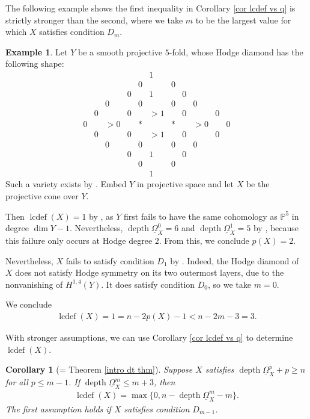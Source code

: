 \documentclass[11pt]{amsart}
\newtheorem{corollary}[equation]{Corollary}
\theoremstyle{definition}
\newtheorem{example}[equation]{Example}
\theoremstyle{plain}
\newcounter{intro}
\DeclareMathOperator{\lcdef}{lcdef}
\DeclareMathOperator{\depth}{depth}
\begin{document}
The following example shows the first inequality in Corollary \ref{cor lcdef vs q} is strictly stronger than the second, where we take $m$ to be the largest value for which $X$ satisfies condition $D_m$.

\begin{example}\label{exmp diamond}
Let $Y$ be a smooth projective $5$-fold, whose Hodge diamond has the following shape:
\[
\begin{array}{ccccccccccc}
&&&&& 1 &&&&&\\
&&&& 0 && 0 &&&&\\
&&& 0 && 1 && 0 &&&\\
&& 0 && 0 && 0 && 0 &&\\
& 0 && 0 && >1 && 0 && 0 &\\
0 && >0 && * && * && >0 && 0\\
& 0 && 0 && >1 && 0 && 0 &\\
&& 0 && 0 && 0 && 0 &&\\
&&& 0 && 1 && 0 &&&\\
&&&& 0 && 0 &&&&\\
&&&&& 1 &&&&&
\end{array}
\]
Such a variety exists by \cite[Theorem $5$]{construction}. Embed $Y$ in projective space and let $X$ be the projective cone over $Y$.

Then $\lcdef(X) = 1$ by \cite[Theorem A]{popa shen}, as $Y$ first fails to have the same cohomology as $\mathbb{P}^5$ in degree $\dim Y-1$. Nevertheless, $\depth \underline{\Omega}_X^0 = 6$ and $\depth \underline{\Omega}_X^1 = 5$ by \cite[Remark $4.5$]{popa shen}, because this failure only occurs at Hodge degree $2$. From this, we conclude $p(X) = 2$.

Nevertheless, $X$ fails to satisfy condition $D_1$ by \cite[Theorem $7.1$]{popa park lefschetz}. Indeed, the Hodge diamond of $X$ does not satisfy Hodge symmetry on its two outermost layers, due to the nonvanishing of $H^{1,4}(Y)$. It does satisfy condition $D_0$, so we take $m=0$.

We conclude
\begin{align*}
    \lcdef(X) = 1 = n-2p(X)-1 < n - 2m-3 = 3.
\end{align*}
\end{example}

With stronger assumptions, we can use Corollary \ref{cor lcdef vs q} to determine $\lcdef(X)$.

\begin{corollary}[= Theorem \ref{intro dt thm}]\label{cor lcdef = body}
Suppose $X$ satisfies $\depth \underline{\Omega}_X^p +p \geq n$ for all $p \leq m-1$. If $\depth \underline{\Omega}_X^m \leq m+3$, then
\begin{align*}
    \lcdef(X) = \max \{ 0, n-\depth \underline{\Omega}_X^m -m \}.
\end{align*}
The first assumption holds if $X$ satisfies condition $D_{m-1}$.
\end{corollary}
\end{document}
